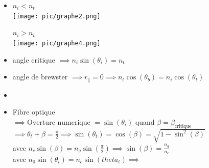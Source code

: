 \documentclass[12pt]{book}
\begin{document}
\begin{itemize}
            \item \begin{center}
                \begin{minipage}{0.49\linewidth}
                    $n_i < n_t$\\
                    \texttt{[image: pic/graphe2.png]}
                    \end{minipage}
                    \begin{minipage}{0.49\linewidth}
                        $n_i > n_t$\\
                        \texttt{[image: pic/graphe4.png]}
                    \end{minipage}
            \end{center}
            \item angle critique $ \implies n_i\sin(\theta_i) = n_t $
            \item angle de brewster $ \implies r_{\parallel} =0 \implies n_t\cos(\theta_b) = n_i\cos(\theta_t) $
            \item \begin{center}
                \end{center}
            
                  
            \item  Fibre optique\\
                $ \implies \text{Overture numerique }  = \sin(\theta_i) $ quand $ \beta=\beta_{\text{critique}} $\\
                $ \implies \theta_t+\beta = \frac{\pi}{2} \implies \sin(\theta_t) =\cos(\beta) =\sqrt{1-\sin^2(\beta)}$   \\
                avec $ n_c\sin(\beta)=n_g\sin(\frac{\pi}{2})\implies \sin(\beta) =\frac{n_g}{n_c} $\\
                avec $ n_0\sin(\theta_i) =n_c\sin(theta_t)  \implies $ 
           \end{itemize}

            
\end{document}
